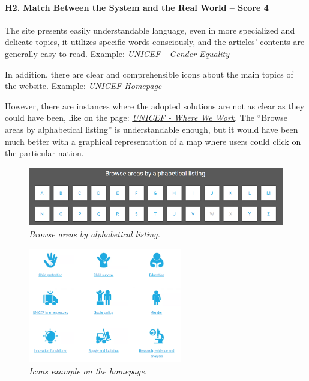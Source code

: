 \paragraph*{H2. Match Between the System and the Real World – Score 4}
The site presents easily understandable language, even in more specialized and delicate topics, it utilizes specific words consciously, and the articles' contents are generally easy to read.
Example: \textit{\href{https://www.unicef.org/gender-equality}{UNICEF - Gender Equality}}

In addition, there are clear and comprehensible icons about the main topics of the website.
Example: \textit{\href{https://www.unicef.org/}{UNICEF Homepage}}

However, there are instances where the adopted solutions are not as clear as they could have been, like on the page: \textit{\href{https://www.unicef.org/where-we-work}{UNICEF - Where We Work}}. The “Browse areas by alphabetical listing” is understandable enough, but it would have been much better with a graphical representation of a map where users could click on the particular nation.
\begin{figure}[h]
	\includegraphics[width=\textwidth]{Picture3.png}
	\captionsetup{font=small}
	\caption{\textit{Browse areas by alphabetical listing.}}
	\label{fig:label2}
\end{figure}
\begin{figure}[h]
	\centering
	\begin{center}
		\includegraphics[width=0.6\textwidth]{Picture2.png}
	\end{center}
	\captionsetup{font=small}
	\caption{\textit{Icons example on the homepage.}}
	\label{fig:label3}
\end{figure}


